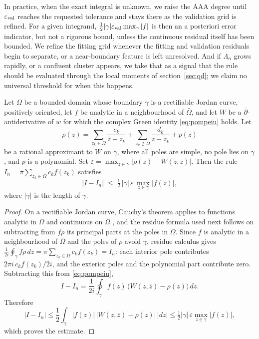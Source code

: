 \documentclass[onefignum,onetabnum]{siamart220329}
\newcommand{\eps}{\varepsilon}
\begin{document}
In practice, when the exact integral is unknown, we raise the AAA
degree until $\eps_{\rm val}$ reaches the requested tolerance and stays
there as the validation grid is refined. For a given integrand,
$\tfrac12|\gamma|\eps_{\rm val}\max_\gamma|f|$ is then an a posteriori
error indicator, but not a rigorous bound, unless the continuous
residual itself has been bounded. We refine the fitting grid whenever
the fitting and validation residuals begin to separate, or a
near-boundary feature is left unresolved. And if $\Lambda_n$ grows
rapidly, or a confluent cluster appears, we take that as a signal that
the rule should be evaluated through the local moments of
section~\ref{sec:qd}; we claim no universal threshold for when this
happens.

\begin{theorem}\label{thm:cert}
Let $\Omega$ be a bounded domain whose boundary $\gamma$ is a
rectifiable Jordan curve, positively oriented, let $f$ be analytic in
a neighbourhood of $\bar\Omega$, and let $W$ be a
$\bar\partial$-antiderivative of $w$ for which the complex Green
identity \eqref{eq:pompeiu} holds. Let
\[
\rho(z)
= \sum_{z_k \in \Omega} \frac{c_k}{z-z_k}
+ \sum_{z_k \notin \Omega} \frac{d_k}{z-z_k}
+ p(z)
\]
be a rational approximant to $W$ on $\gamma$, where all poles are
simple, no pole lies on $\gamma$, and $p$ is a polynomial. Set
$\eps = \max_{z \in \gamma} |\rho(z) - W(z,\bar z)|$. Then the rule
$I_n = \pi \sum_{z_k \in \Omega} c_k f(z_k)$ satisfies
\[
|I - I_n| \;\le\; \tfrac{1}{2}\, |\gamma| \, \eps \,
\max_{z \in \gamma} |f(z)| ,
\]
where $|\gamma|$ is the length of $\gamma$.
\end{theorem}

\begin{proof}
On a rectifiable Jordan curve, Cauchy's theorem applies to functions
analytic in $\Omega$ and continuous on $\bar\Omega$ \cite{Walsh1933},
and the residue formula used next follows on subtracting from $f\rho$
its principal parts at the poles in $\Omega$.
Since $f$ is analytic in a neighbourhood of $\bar\Omega$ and the poles of $\rho$ avoid
$\gamma$, residue calculus gives
$\frac{1}{2i}\oint_\gamma f \rho \, dz = \pi \sum_{z_k \in \Omega}
c_k f(z_k) = I_n$: each interior pole contributes
$2\pi i\, c_k f(z_k)/2i$, and the exterior poles and the polynomial
part contribute zero. Subtracting this from \eqref{eq:pompeiu},
\[
I - I_n = \frac{1}{2i} \oint_\gamma f(z) \,
\bigl(W(z,\bar z) - \rho(z)\bigr)\, dz .
\]
Therefore
\[
|I-I_n|
\leq \frac12 \int_\gamma |f(z)|\, |W(z,\bar z)-\rho(z)|\, |dz|
\leq \tfrac12 |\gamma|\, \eps \max_{z\in\gamma}|f(z)|,
\]
which proves the estimate.
\end{proof}
\end{document}
